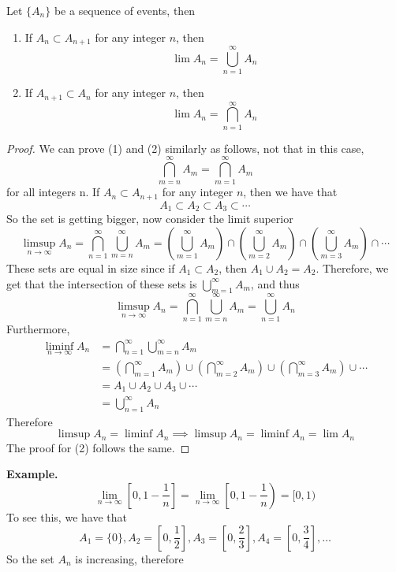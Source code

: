 \begin{lemma}
    Let $\{A_n\}$ be a sequence of events, then 
    \begin{enumerate}
        \item If $A_n \subset A_{n+1}$ for any integer $n$, then 
        \[\lim A_n = \bigcup_{n=1}^\infty A_n\]
        \item If $A_{n+1} \subset A_n$ for any integer $n$, then
        \[\lim A_n = \bigcap_{n=1}^\infty A_n\]
    \end{enumerate}
\end{lemma}
\begin{proof}
    We can prove (1) and (2) similarly as follows, not that in this case, 
    \[\bigcap_{m=n}^\infty A_m = \bigcap_{m=1}^\infty A_m\]
    for all integers n. If $A_n \subset A_{n+1}$ for any integer $n$, then we have that 
    \[A_1 \subset A_2 \subset A_3 \subset \cdots \]
    So the set is getting bigger, now consider the limit superior 
    \[\limsup_{n\rightarrow\infty} A_n = \bigcap_{n=1}^\infty \bigcup_{m=n}^\infty A_m= \left(\bigcup_{m=1}^\infty A_m\right) \cap \left(\bigcup_{m=2}^\infty A_m\right) \cap \left(\bigcup_{m=3}^\infty A_m\right) \cap \cdots\]
    These sets are equal in size since if $A_1 \subset A_2$, then $A_1 \cup A_2 = A_2$. Therefore, we get that the intersection of these sets is $\bigcup\limits_{m=1}^\infty A_m$, and thus 
    \[\limsup_{n\rightarrow \infty} A_n = \bigcap_{n=1}^\infty\bigcup_{m=n}^\infty A_m = \bigcup_{n=1}^\infty A_n\]
    Furthermore, 
    \begin{align*}
        \liminf_{n\rightarrow\infty} A_n &= \bigcap_{n=1}^\infty \bigcup_{m=n}^\infty A_m\\
        &= \left(\bigcap_{m=1}^\infty A_m\right) \cup \left(\bigcap_{m=2}^\infty A_m\right) \cup \left(\bigcap_{m=3}^\infty A_m\right) \cup \cdots \\
        &=  A_1 \cup A_2 \cup A_3 \cup \cdots \\
        &= \bigcup_{n=1}^\infty A_n
    \end{align*}
    Therefore 
    \[\limsup A_n = \liminf A_n \implies \limsup A_n = \liminf A_n = \lim A_n\]
    The proof for (2) follows the same. 
\end{proof}
\noindent
\textbf{Example.} 
\[\lim_{n\rightarrow\infty} \left[0, 1 - \frac{1}{n}\right] = \lim_{n\rightarrow\infty} \left[0, 1 - \frac{1}{n}\right) = [0,1)\]
To see this, we have that 
\[A_1 = \{0\}, A_2 = \left[0,\frac{1}{2}\right], A_3 = \left[0,\frac{2}{3}\right],A_4 = \left[0,\frac{3}{4}\right], \ldots \]
So the set $A_n$ is increasing, therefore 
